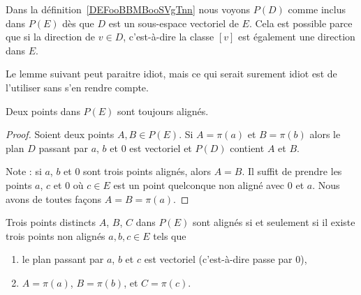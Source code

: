 \begin{normaltext}
    Dans la définition~\ref{DEFooBBMBooSVgTnn} nous voyons \( P(D)\) comme inclus dans \( P(E)\) dès que \( D\) est un sous-espace vectoriel de \( E\). Cela est possible parce que si la direction de \( v\in D\), c'est-à-dire la classe \( [v]\) est également une direction dans \( E\).
\end{normaltext}

Le lemme suivant peut paraitre idiot, mais ce qui serait surement idiot est de l'utiliser sans s'en rendre compte.

\begin{lemma}
    Deux points dans \( P(E)\) sont toujours alignés.
\end{lemma}

\begin{proof}
    Soient deux points \( A,B\in P(E)\). Si \( A=\pi(a)\) et \( B=\pi(b)\) alors le plan \( D\) passant par \( a\), \( b\) et \( 0\) est vectoriel et \( P(D)\) contient \( A\) et \( B\).

    Note : si \( a\), \( b\) et \( 0\) sont trois points alignés, alors \( A=B\). Il suffit de prendre les points \( a\), \( c\) et \( 0\) où \( c\in E\) est un point quelconque non aligné avec \( 0\) et \( a\). Nous avons de toutes façons \( A=B=\pi(a)\).
\end{proof}

\begin{lemma}
    Trois points distincts \( A\), \( B\), \( C\) dans \( P(E)\) sont alignés si et seulement si il existe trois points non alignés \( a,b,c\in E\) tels que
    \begin{enumerate}
        \item
            le plan passant par \( a\), \( b\) et \( c\) est vectoriel (c'est-à-dire passe par \( 0\)),
        \item
            \( A=\pi(a)\), \( B=\pi(b)\), et \( C=\pi(c)\).
    \end{enumerate}
\end{lemma}

